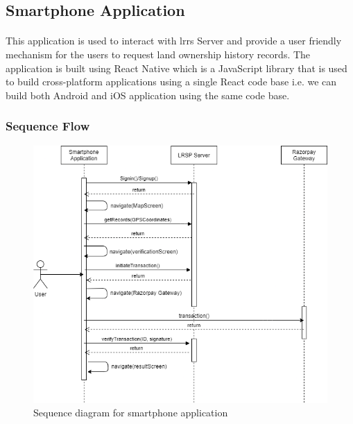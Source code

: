 \documentclass{article}
\begin{document}
    \subsection{Smartphone Application}
        \paragraph{}
        This application is used to interact with \gls{lrrs} Server and provide a user friendly mechanism for the users to request land ownership history records.
        The application is built using React Native which is a JavaScript library that is used to build cross-platform applications using a single React code base i.e. we can build both Android and iOS application using the same code base. 
        
        \subsubsection{Sequence Flow}
        \begin{figure}[htbp]
            \includegraphics[scale=0.5]{app_sequence}
            \centering
            \caption{Sequence diagram for smartphone application}
        \end{figure}
\end{document}
